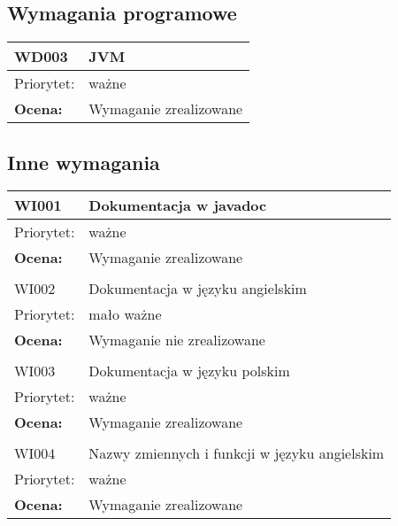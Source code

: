 \documentclass[a4paper,10pt]{article}
\begin{document}
\subsection{Wymagania programowe}


\begin{center}

\begin{tabular}{|m{3cm}|m{9cm}|} \hline

WD003 & JVM \\ \hline
Priorytet: & ważne \\ \hline
\textbf{Ocena:} & Wymaganie zrealizowane \\ \hline
\end{tabular}

\end{center}

\subsection{Inne wymagania}

\begin{center}

\begin{tabular}{|m{3cm}|m{9cm}|} \hline

WI001 & Dokumentacja w javadoc \\ \hline
Priorytet: & ważne \\ \hline
\textbf{Ocena:} & Wymaganie zrealizowane \\ \hline
\multicolumn{2}{c}{} \\
 \hline

WI002 & Dokumentacja w języku angielskim \\ \hline
Priorytet: & mało ważne \\ \hline
\textbf{Ocena:} & Wymaganie nie zrealizowane \\ \hline

\multicolumn{2}{c}{} \\
 \hline

WI003 & Dokumentacja w języku polskim \\ \hline
Priorytet: & ważne \\ \hline
\textbf{Ocena:} & Wymaganie zrealizowane \\ \hline

\multicolumn{2}{c}{} \\
 \hline
WI004 & Nazwy zmiennych i funkcji w języku angielskim \\ \hline
Priorytet: & ważne \\ \hline
\textbf{Ocena:} & Wymaganie zrealizowane \\ \hline

\end{tabular}

\end{center}
\end{document}
